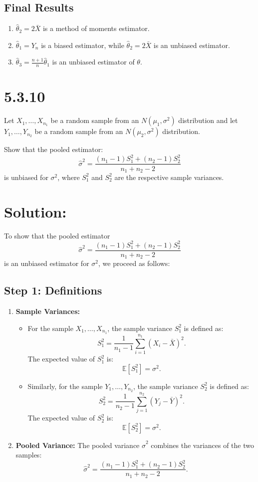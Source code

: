 \documentclass{article}
\begin{document}
\subsection*{Final Results}
\begin{enumerate}
    \item[(a)] $\hat{\theta}_2 = 2\bar{X}$ is a method of moments estimator.
    \item[(b)] $\hat{\theta}_1 = Y_n$ is a biased estimator, while $\hat{\theta}_2 = 2\bar{X}$ is an unbiased estimator.
    \item[(c)] $\hat{\theta}_3 = \frac{n+1}{n} \hat{\theta}_1$ is an unbiased estimator of $\theta$.
\end{enumerate}

\section*{5.3.10}

Let $X_1, \dots, X_{n_1}$ be a random sample from an $N(\mu_1, \sigma^2)$ distribution and let $Y_1, \dots, Y_{n_2}$ be a random sample from an $N(\mu_2, \sigma^2)$ distribution. 

Show that the pooled estimator:
\[
\hat{\sigma}^2 = \frac{(n_1 - 1)S_1^2 + (n_2 - 1)S_2^2}{n_1 + n_2 - 2}
\]
is unbiased for $\sigma^2$, where $S_1^2$ and $S_2^2$ are the respective sample variances.


\section*{Solution:}

To show that the pooled estimator 
\[
\hat{\sigma}^2 = \frac{(n_1 - 1)S_1^2 + (n_2 - 1)S_2^2}{n_1 + n_2 - 2}
\]
is an unbiased estimator for $\sigma^2$, we proceed as follows:

\subsection*{Step 1: Definitions}
\begin{enumerate}
    \item \textbf{Sample Variances:}
    \begin{itemize}
        \item For the sample $X_1, \dots, X_{n_1}$, the sample variance $S_1^2$ is defined as:
        \[
        S_1^2 = \frac{1}{n_1 - 1} \sum_{i=1}^{n_1} (X_i - \bar{X})^2.
        \]
        The expected value of $S_1^2$ is:
        \[
        \mathbb{E}[S_1^2] = \sigma^2.
        \]
        \item Similarly, for the sample $Y_1, \dots, Y_{n_2}$, the sample variance $S_2^2$ is defined as:
        \[
        S_2^2 = \frac{1}{n_2 - 1} \sum_{j=1}^{n_2} (Y_j - \bar{Y})^2.
        \]
        The expected value of $S_2^2$ is:
        \[
        \mathbb{E}[S_2^2] = \sigma^2.
        \]
    \end{itemize}

    \item \textbf{Pooled Variance:} The pooled variance $\hat{\sigma}^2$ combines the variances of the two samples:
    \[
    \hat{\sigma}^2 = \frac{(n_1 - 1)S_1^2 + (n_2 - 1)S_2^2}{n_1 + n_2 - 2}.
    \]
\end{enumerate}
\end{document}
